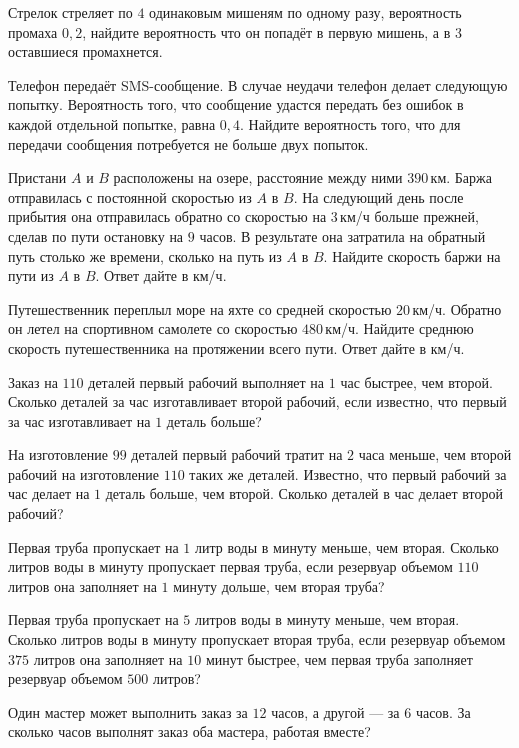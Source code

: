 \begin{consultation}
\begin{listofex}
		\item Стрелок стреляет по \( 4 \) одинаковым мишеням по одному разу, вероятность промаха \( 0,2 \), найдите вероятность что он попадёт в первую мишень, а в \( 3 \) оставшиеся промахнется.
		\item Телефон передаёт SMS-сообщение. В случае неудачи телефон делает следующую попытку. Вероятность того, что сообщение удастся передать без ошибок в каждой отдельной попытке, равна \( 0,4 \). Найдите вероятность того, что для передачи сообщения потребуется не больше двух попыток.
		\item Пристани \( A \) и \( B \) расположены на озере, расстояние между ними \( 390 \) км. Баржа отправилась с постоянной скоростью из \( A \) в \( B \). На следующий день после прибытия она отправилась обратно со скоростью на \( 3 \) км/ч больше прежней, сделав по пути остановку на \( 9 \) часов. В результате она затратила на обратный путь столько же времени, сколько на путь из \( A \) в \( B \). Найдите скорость баржи на пути из \( A \) в \( B \). Ответ дайте в км/ч.
		\item Путешественник переплыл море на яхте со средней скоростью \( 20 \) км/ч. Обратно он летел на спортивном самолете со скоростью \( 480 \) км/ч. Найдите среднюю скорость путешественника на протяжении всего пути. Ответ дайте в км/ч.
		\item Заказ на \( 110 \) деталей первый рабочий выполняет на \( 1 \) час быстрее, чем второй. Сколько деталей за час изготавливает второй рабочий, если известно, что первый за час изготавливает на \( 1 \) деталь больше?
		\item На изготовление \( 99 \) деталей первый рабочий тратит на \( 2 \) часа меньше, чем второй рабочий на изготовление \( 110 \) таких же деталей. Известно, что первый рабочий за час делает на \( 1 \) деталь больше, чем второй. Сколько деталей в час делает второй рабочий?
		\item Первая труба пропускает на \( 1 \) литр воды в минуту меньше, чем вторая. Сколько литров воды в минуту пропускает первая труба, если резервуар объемом \( 110 \) литров она заполняет на \( 1 \) минуту дольше, чем вторая труба?
		\item Первая труба пропускает на \( 5 \) литров воды в минуту меньше, чем вторая. Сколько литров воды в минуту пропускает вторая труба, если резервуар объемом \( 375 \) литров она заполняет на \( 10 \) минут быстрее, чем первая труба заполняет резервуар объемом \( 500 \) литров?
		\item Один мастер может выполнить заказ за \( 12 \) часов, а другой --- за \( 6 \) часов. За сколько часов выполнят заказ оба мастера, работая вместе?
	\end{listofex}
\end{consultation}
